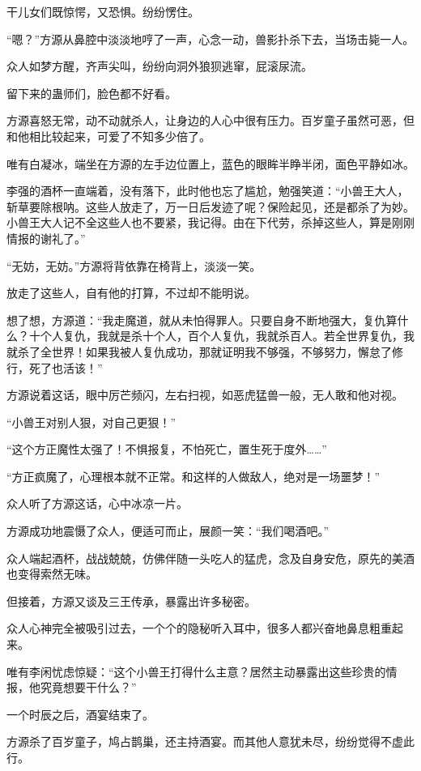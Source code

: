 \begin{this_body}
干儿女们既惊愕，又恐惧。纷纷愣住。

“嗯？”方源从鼻腔中淡淡地哼了一声，心念一动，兽影扑杀下去，当场击毙一人。

众人如梦方醒，齐声尖叫，纷纷向洞外狼狈逃窜，屁滚尿流。

留下来的蛊师们，脸色都不好看。

方源喜怒无常，动不动就杀人，让身边的人心中很有压力。百岁童子虽然可恶，但和他相比较起来，可爱了不知多少倍了。

唯有白凝冰，端坐在方源的左手边位置上，蓝色的眼眸半睁半闭，面色平静如冰。

李强的酒杯一直端着，没有落下，此时他也忘了尴尬，勉强笑道：“小兽王大人，斩草要除根呐。这些人放走了，万一日后发迹了呢？保险起见，还是都杀了为妙。小兽王大人记不全这些人也不要紧，我记得。由在下代劳，杀掉这些人，算是刚刚情报的谢礼了。”

“无妨，无妨。”方源将背依靠在椅背上，淡淡一笑。

放走了这些人，自有他的打算，不过却不能明说。

想了想，方源道：“我走魔道，就从未怕得罪人。只要自身不断地强大，复仇算什么？十个人复仇，我就是杀十个人，百个人复仇，我就杀百人。若全世界复仇，我就杀了全世界！如果我被人复仇成功，那就证明我不够强，不够努力，懈怠了修行，死了也活该！”

方源说着这话，眼中厉芒频闪，左右扫视，如恶虎猛兽一般，无人敢和他对视。

“小兽王对别人狠，对自己更狠！”

“这个方正魔性太强了！不惧报复，不怕死亡，置生死于度外……”

“方正疯魔了，心理根本就不正常。和这样的人做敌人，绝对是一场噩梦！”

众人听了方源这话，心中冰凉一片。

方源成功地震慑了众人，便适可而止，展颜一笑：“我们喝酒吧。”

众人端起酒杯，战战兢兢，仿佛伴随一头吃人的猛虎，念及自身安危，原先的美酒也变得索然无味。

但接着，方源又谈及三王传承，暴露出许多秘密。

众人心神完全被吸引过去，一个个的隐秘听入耳中，很多人都兴奋地鼻息粗重起来。

唯有李闲忧虑惊疑：“这个小兽王打得什么主意？居然主动暴露出这些珍贵的情报，他究竟想要干什么？”

一个时辰之后，酒宴结束了。

方源杀了百岁童子，鸠占鹊巢，还主持酒宴。而其他人意犹未尽，纷纷觉得不虚此行。


\end{this_body}
